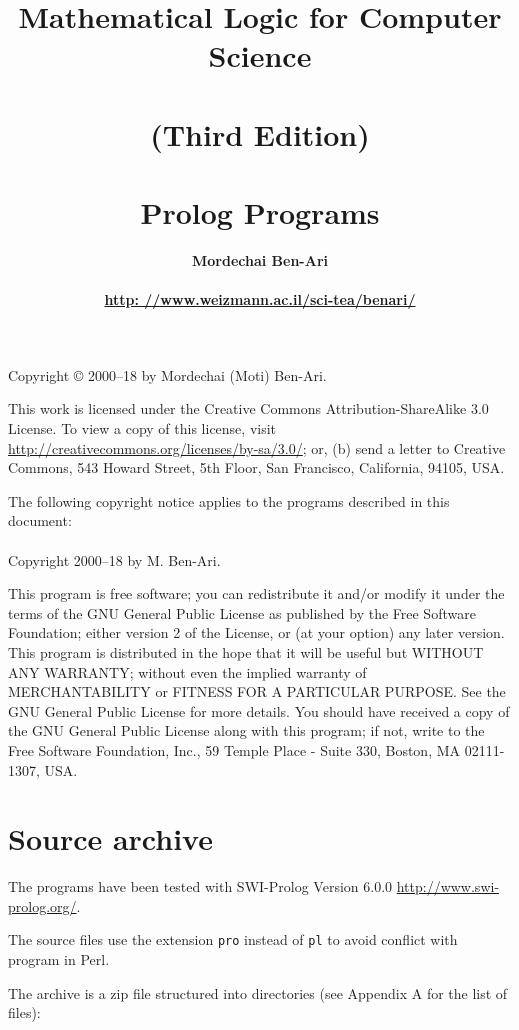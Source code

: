 \documentclass[11pt]{article}
\author{\bfseries Mordechai Ben-Ari\\\mbox{}\\\url{http: //www.weizmann.ac.il/sci-tea/benari/}}
\title{\bfseries Mathematical Logic for Computer Science\\\mbox{}\\
\bfseries\large (Third Edition)\\\mbox{}\\
\bfseries\Large Prolog Programs}
\newcommand*{\p}[1]{\textup{\texttt{#1}}}
\begin{document}
\maketitle
\thispagestyle{empty}

\bigskip

\begin{center}
Copyright \copyright{} 2000--18 by Mordechai (Moti) Ben-Ari.
\end{center}
This work is licensed under the Creative Commons Attribution-ShareAlike 3.0
License. To view a copy of this license, visit
\url{http://creativecommons.org/licenses/by-sa/3.0/}; or, (b) send a letter
to Creative Commons, 543 Howard Street, 5th Floor, San Francisco,
California, 94105, USA.

\vfill
 
\begin{center}
The following copyright notice applies to the programs described in this
document:\mbox{}\\\mbox{}\\
Copyright 2000--18 by M. Ben-Ari.
\end{center}

This program is free software; you can redistribute it and/or
modify it under the terms of the GNU General Public License
as published by the Free Software Foundation; either version 2
of the License, or (at your option) any later version.
This program is distributed in the hope that it will be useful
but WITHOUT ANY WARRANTY; without even the implied warranty of
MERCHANTABILITY or FITNESS FOR A PARTICULAR PURPOSE.
See the GNU General Public License for more details.
You should have received a copy of the GNU General Public License
along with this program; if not, write to the Free Software
Foundation, Inc., 59 Temple Place - Suite 330, Boston, MA
02111-1307, USA.

\newpage

\section{Source archive}\label{s.archive}

The programs have been tested with SWI-Prolog Version 6.0.0
\url{http://www.swi-prolog.org/}.

The source files use the extension \p{pro} instead of
\p{pl} to avoid conflict with program in Perl.

The archive is a zip file structured into directories (see Appendix A
for the list of files):
\end{document}
